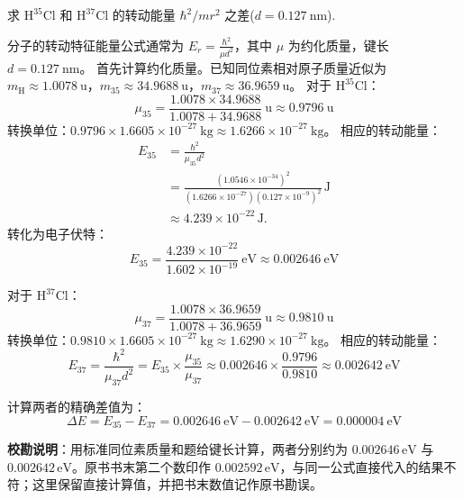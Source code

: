 \begin{exercise}\label{ex:26.5}
求 $\mathrm{H}^{35}\mathrm{Cl}$ 和 $\mathrm{H}^{37}\mathrm{Cl}$ 的转动能量 $\hbar^2/mr^2$ 之差($d = 0.127 \ \mathrm{nm}$).
\end{exercise}
\begin{solution}
分子的转动特征能量公式通常为 $E_r = \frac{\hbar^2}{\mu d^2}$，其中 $\mu$ 为约化质量，键长 $d = 0.127 \ \mathrm{nm}$。
首先计算约化质量。已知同位素相对原子质量近似为 $m_{\mathrm{H}} \approx 1.0078 \ \mathrm{u}$，$m_{35} \approx 34.9688 \ \mathrm{u}$，$m_{37} \approx 36.9659 \ \mathrm{u}$。
对于 $\mathrm{H}^{35}\mathrm{Cl}$：
$$ \mu_{35} = \frac{1.0078 \times 34.9688}{1.0078 + 34.9688} \ \mathrm{u} \approx 0.9796 \ \mathrm{u} $$
转换单位：$0.9796 \times 1.6605 \times 10^{-27} \ \mathrm{kg} \approx 1.6266 \times 10^{-27} \ \mathrm{kg}$。
相应的转动能量：
\[
\begin{aligned}
E_{35}&=\frac{\hbar^2}{\mu_{35}d^2}\\
&=\frac{(1.0546\times10^{-34})^2}
{(1.6266\times10^{-27})(0.127\times10^{-9})^2}\,\mathrm J\\
&\approx4.239\times10^{-22}\,\mathrm J.
\end{aligned}
\]
转化为电子伏特：
$$ E_{35} = \frac{4.239 \times 10^{-22}}{1.602 \times 10^{-19}} \ \mathrm{eV} \approx 0.002646 \ \mathrm{eV} $$

对于 $\mathrm{H}^{37}\mathrm{Cl}$：
$$ \mu_{37} = \frac{1.0078 \times 36.9659}{1.0078 + 36.9659} \ \mathrm{u} \approx 0.9810 \ \mathrm{u} $$
转换单位：$0.9810 \times 1.6605 \times 10^{-27} \ \mathrm{kg} \approx 1.6290 \times 10^{-27} \ \mathrm{kg}$。
相应的转动能量：
$$ E_{37} = \frac{\hbar^2}{\mu_{37} d^2} = E_{35} \times \frac{\mu_{35}}{\mu_{37}} \approx 0.002646 \times \frac{0.9796}{0.9810} \approx 0.002642 \ \mathrm{eV} $$

计算两者的精确差值为：
$$ \Delta E = E_{35} - E_{37} = 0.002646 \ \mathrm{eV} - 0.002642 \ \mathrm{eV} = 0.000004 \ \mathrm{eV} $$

\textbf{校勘说明}：用标准同位素质量和题给键长计算，两者分别约为 $0.002646\,\mathrm{eV}$ 与 $0.002642\,\mathrm{eV}$。原书书末第二个数印作 $0.002592\,\mathrm{eV}$，与同一公式直接代入的结果不符；这里保留直接计算值，并把书末数值记作原书勘误。

\end{solution}

